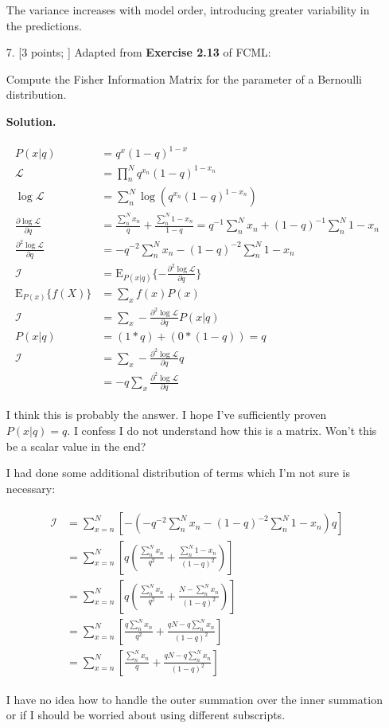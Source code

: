 \documentclass[10pt]{article}
\begin{document}
\begin{itemize}
The variance increases with model order, introducing greater variability in the predictions.

\item[7.] [3 points; \boldred{Required only for Graduates}]
Adapted from {\bf Exercise 2.13} of FCML:

Compute the Fisher Information Matrix for the parameter of a Bernoulli distribution.

{\bf Solution.}

\begin{eqnarray*}
\begin{aligned}
P(x|q) &= q^x(1-q)^{1-x}
\\
\mathcal{L} &= \prod_n^N q^{x_n}(1-q)^{1-{x_n}}
\\
\log\mathcal{L} &= \sum_n^N \log \left( q^{x_n} (1-q)^{1-{x_n}} \right)
\\
\frac { \partial \log\mathcal{L}} {\partial q} &= \frac{\sum_n^N x_n}{q} + \frac{\sum_n^N 1 - x_n}{1 - q}
= q^{-1} \sum_n^N x_n + (1 - q)^{-1} \sum_n^N 1 - x_n
\\
\frac { \partial^2 \log\mathcal{L}} {\partial q} &= - q^{-2} \sum_n^N x_n - (1 - q)^{-2} \sum_n^N 1 - x_n
\\
\mathcal{I} &= \mathrm{E}_{P(x|q)} \{ - \frac { \partial^2 \log\mathcal{L}} {\partial q} \}
\\
\mathrm{E}_{P(x)} \{ f(X) \} &= \sum_x f(x) P(x)
\\
\mathcal{I} &= \sum_x - \frac { \partial^2 \log\mathcal{L}} {\partial q} P(x|q)
\\
P(x|q) &= (1 * q) + (0 * (1 - q)) = q
\\
\mathcal{I} &= \sum_x - \frac { \partial^2 \log\mathcal{L}} {\partial q} q
\\
&= -q \sum_x \frac { \partial^2 \log\mathcal{L}} {\partial q}
\end{aligned}
\end{eqnarray*}

I think this is probably the answer. I hope I've sufficiently proven $P(x|q) = q$. I confess I do not understand how this is a matrix. Won't this be a scalar value in the end?

I had done some additional distribution of terms which I'm not sure is necessary:

\begin{eqnarray*}
\begin{aligned}
\mathcal{I} &= \sum_{x=n}^N \left[ - \left(- q^{-2} \sum_n^N x_n - (1 - q)^{-2} \sum_n^N 1 - x_n \right) q \right]
\\
&= \sum_{x=n}^N \left[ q \left( \frac{\sum_n^N x_n}{q^2} + \frac{\sum_n^N 1 - x_n}{(1 - q)^{2}} \right) \right]
\\
&= \sum_{x=n}^N \left[ q \left( \frac{\sum_n^N x_n}{q^2} + \frac{N - \sum_n^N x_n}{(1 - q)^{2}} \right) \right]
\\
&= \sum_{x=n}^N \left[ \frac{q \sum_n^N x_n}{q^2} + \frac{qN - q \sum_n^N x_n}{(1 - q)^{2}} \right]
\\
&= \sum_{x=n}^N \left[ \frac{\sum_n^N x_n}{q} + \frac{qN - q \sum_n^N x_n}{(1 - q)^{2}} \right]
\end{aligned}
\end{eqnarray*}

I have no idea how to handle the outer summation over the inner summation or if I should be worried about using different subscripts. 
\end{itemize}
\end{document}
